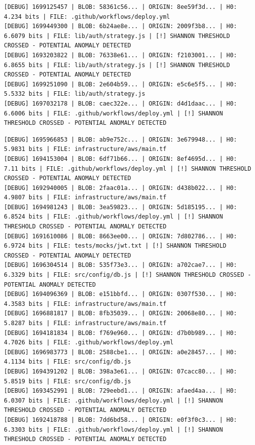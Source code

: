 \documentclass[12pt, a4paper, oneside]{report}
\begin{document}
\begin{lstlisting}[basicstyle=\tiny\ttfamily]
[DEBUG] 1699125457 | BLOB: 58361c56... | ORIGIN: 8ee59f3d... | H0: 4.234 bits | FILE: .github/workflows/deploy.yml
[DEBUG] 1699449300 | BLOB: 6b24ae8e... | ORIGIN: 2009f3b8... | H0: 6.6079 bits | FILE: lib/auth/strategy.js | [!] SHANNON THRESHOLD CROSSED - POTENTIAL ANOMALY DETECTED
[DEBUG] 1693203822 | BLOB: 76338e61... | ORIGIN: f2103001... | H0: 6.8655 bits | FILE: lib/auth/strategy.js | [!] SHANNON THRESHOLD CROSSED - POTENTIAL ANOMALY DETECTED
[DEBUG] 1699251090 | BLOB: 2e604b59... | ORIGIN: e5c6e5f5... | H0: 5.5332 bits | FILE: lib/auth/strategy.js
[DEBUG] 1697032178 | BLOB: caec322e... | ORIGIN: d4d1daac... | H0: 6.6006 bits | FILE: .github/workflows/deploy.yml | [!] SHANNON THRESHOLD CROSSED - POTENTIAL ANOMALY DETECTED
\end{lstlisting}
\begin{lstlisting}[basicstyle=\tiny\ttfamily]
[DEBUG] 1695966853 | BLOB: ab9e752c... | ORIGIN: 3e679948... | H0: 5.9831 bits | FILE: infrastructure/aws/main.tf
[DEBUG] 1694153004 | BLOB: 6df71b66... | ORIGIN: 8ef4695d... | H0: 7.11 bits | FILE: .github/workflows/deploy.yml | [!] SHANNON THRESHOLD CROSSED - POTENTIAL ANOMALY DETECTED
[DEBUG] 1692940005 | BLOB: 2faac01a... | ORIGIN: d438b022... | H0: 4.9807 bits | FILE: infrastructure/aws/main.tf
[DEBUG] 1694981243 | BLOB: 3ea59823... | ORIGIN: 5d185195... | H0: 6.8524 bits | FILE: .github/workflows/deploy.yml | [!] SHANNON THRESHOLD CROSSED - POTENTIAL ANOMALY DETECTED
[DEBUG] 1691610086 | BLOB: 8663ee00... | ORIGIN: 7d802786... | H0: 6.9724 bits | FILE: tests/mocks/jwt.txt | [!] SHANNON THRESHOLD CROSSED - POTENTIAL ANOMALY DETECTED
[DEBUG] 1696304514 | BLOB: 535f73e3... | ORIGIN: a702cae7... | H0: 6.3329 bits | FILE: src/config/db.js | [!] SHANNON THRESHOLD CROSSED - POTENTIAL ANOMALY DETECTED
[DEBUG] 1694096369 | BLOB: e151bbfd... | ORIGIN: 0307f530... | H0: 4.3583 bits | FILE: infrastructure/aws/main.tf
[DEBUG] 1696881817 | BLOB: 8fb35039... | ORIGIN: 20068e80... | H0: 5.8287 bits | FILE: infrastructure/aws/main.tf
[DEBUG] 1694181834 | BLOB: f769e960... | ORIGIN: d7b0b989... | H0: 4.7026 bits | FILE: .github/workflows/deploy.yml
[DEBUG] 1696983773 | BLOB: 2588cbe1... | ORIGIN: a0e28457... | H0: 4.1134 bits | FILE: src/config/db.js
[DEBUG] 1694391202 | BLOB: 398a3e61... | ORIGIN: 07cacc80... | H0: 5.8519 bits | FILE: src/config/db.js
[DEBUG] 1693452991 | BLOB: 729eebd1... | ORIGIN: afaed4aa... | H0: 6.0307 bits | FILE: .github/workflows/deploy.yml | [!] SHANNON THRESHOLD CROSSED - POTENTIAL ANOMALY DETECTED
[DEBUG] 1692418788 | BLOB: 7dd6bd58... | ORIGIN: e0f3f0c3... | H0: 6.3303 bits | FILE: .github/workflows/deploy.yml | [!] SHANNON THRESHOLD CROSSED - POTENTIAL ANOMALY DETECTED

\end{lstlisting}
\end{document}
